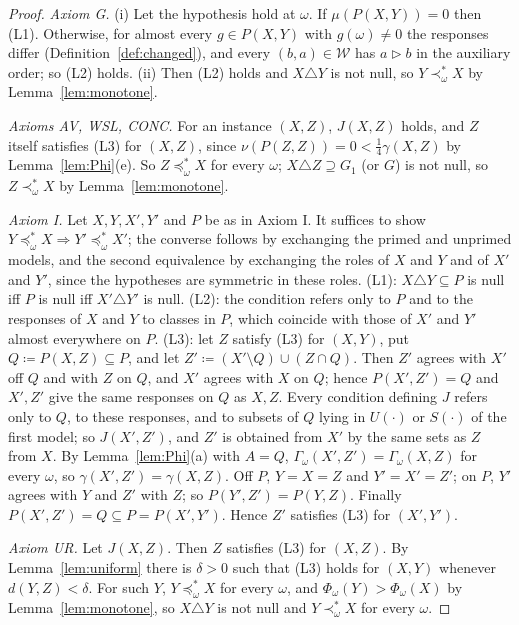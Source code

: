 \documentclass[11pt]{article}
\theoremstyle{definition}
\begin{document}
\begin{proof}
\emph{Axiom G.} (i) Let the hypothesis hold at $\omega$. If $\mu(P(X,Y))=0$ then (L1). Otherwise, for almost every $g\in P(X,Y)$ with $g(\omega)\ne0$ the responses differ (Definition~\ref{def:changed}), and every $(b,a)\in\mathcal W$ has $a\rhd b$ in the auxiliary order; so (L2) holds. (ii) Then (L2) holds and $X\triangle Y$ is not null, so $Y\prec^\ast_\omega X$ by Lemma~\ref{lem:monotone}.

\emph{Axioms AV, WSL, CONC.} For an instance $(X,Z)$, $J(X,Z)$ holds, and $Z$ itself satisfies (L3) for $(X,Z)$, since $\nu(P(Z,Z))=0<\frac14\gamma(X,Z)$ by Lemma~\ref{lem:Phi}(e). So $Z\preceq^\ast_\omega X$ for every $\omega$; $X\triangle Z\supseteq G_1$ (or $G$) is not null, so $Z\prec^\ast_\omega X$ by Lemma~\ref{lem:monotone}.

\emph{Axiom I.} Let $X,Y,X',Y'$ and $P$ be as in Axiom I. It suffices to show $Y\preceq^\ast_\omega X\Rightarrow Y'\preceq^\ast_\omega X'$; the converse follows by exchanging the primed and unprimed models, and the second equivalence by exchanging the roles of $X$ and $Y$ and of $X'$ and $Y'$, since the hypotheses are symmetric in these roles. (L1): $X\triangle Y\subseteq P$ is null iff $P$ is null iff $X'\triangle Y'$ is null. (L2): the condition refers only to $P$ and to the responses of $X$ and $Y$ to classes in $P$, which coincide with those of $X'$ and $Y'$ almost everywhere on $P$. (L3): let $Z$ satisfy (L3) for $(X,Y)$, put $Q\coloneqq P(X,Z)\subseteq P$, and let $Z'\coloneqq(X'\setminus Q)\cup(Z\cap Q)$. Then $Z'$ agrees with $X'$ off $Q$ and with $Z$ on $Q$, and $X'$ agrees with $X$ on $Q$; hence $P(X',Z')=Q$ and $X',Z'$ give the same responses on $Q$ as $X,Z$. Every condition defining $J$ refers only to $Q$, to these responses, and to subsets of $Q$ lying in $U(\cdot)$ or $S(\cdot)$ of the first model; so $J(X',Z')$, and $Z'$ is obtained from $X'$ by the same sets as $Z$ from $X$. By Lemma~\ref{lem:Phi}(a) with $A=Q$, $\Gamma_\omega(X',Z')=\Gamma_\omega(X,Z)$ for every $\omega$, so $\gamma(X',Z')=\gamma(X,Z)$. Off $P$, $Y=X=Z$ and $Y'=X'=Z'$; on $P$, $Y'$ agrees with $Y$ and $Z'$ with $Z$; so $P(Y',Z')=P(Y,Z)$. Finally $P(X',Z')=Q\subseteq P=P(X',Y')$. Hence $Z'$ satisfies (L3) for $(X',Y')$.

\emph{Axiom UR.} Let $J(X,Z)$. Then $Z$ satisfies (L3) for $(X,Z)$. By Lemma~\ref{lem:uniform} there is $\delta>0$ such that (L3) holds for $(X,Y)$ whenever $d(Y,Z)<\delta$. For such $Y$, $Y\preceq^\ast_\omega X$ for every $\omega$, and $\Phi_\omega(Y)>\Phi_\omega(X)$ by Lemma~\ref{lem:monotone}, so $X\triangle Y$ is not null and $Y\prec^\ast_\omega X$ for every $\omega$.
\end{proof}
\end{document}
